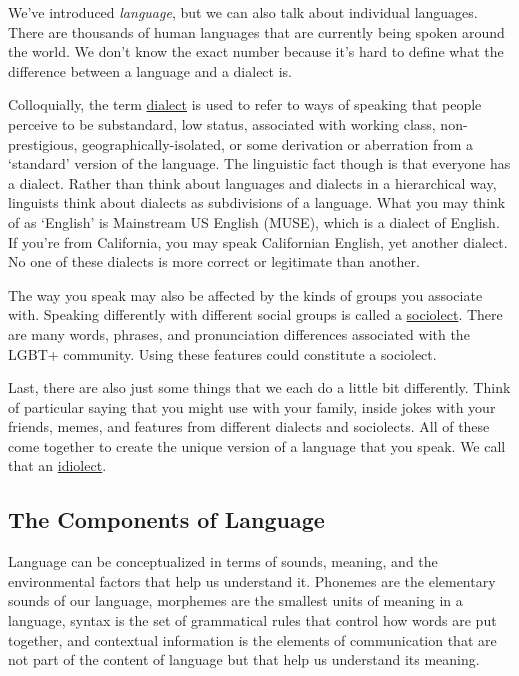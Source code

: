 \documentclass[
]{krantz}
\begin{document}
We've introduced \emph{language}, but we can also talk about individual languages. There are thousands of human languages that are currently being spoken around the world. We don't know the exact number because it's hard to define what the difference between a language and a dialect is.

Colloquially, the term \protect\hyperlink{dialect}{dialect} is used to refer to ways of speaking that people perceive to be substandard, low status, associated with working class, non-prestigious, geographically-isolated, or some derivation or aberration from a `standard' version of the language. The linguistic fact though is that everyone has a dialect. Rather than think about languages and dialects in a hierarchical way, linguists think about dialects as subdivisions of a language. What you may think of as `English' is Mainstream US English (MUSE), which is a dialect of English. If you're from California, you may speak Californian English, yet another dialect. No one of these dialects is more correct or legitimate than another.

The way you speak may also be affected by the kinds of groups you associate with. Speaking differently with different social groups is called a \protect\hyperlink{sociolect}{sociolect}. There are many words, phrases, and pronunciation differences associated with the LGBT+ community. Using these features could constitute a sociolect.

Last, there are also just some things that we each do a little bit differently. Think of particular saying that you might use with your family, inside jokes with your friends, memes, and features from different dialects and sociolects. All of these come together to create the unique version of a language that you speak. We call that an \protect\hyperlink{idiolect}{idiolect}.

\hypertarget{the-components-of-language}{%
\subsection*{The Components of Language}\label{the-components-of-language}}


Language can be conceptualized in terms of sounds, meaning, and the environmental factors that help us understand it. Phonemes are the elementary sounds of our language, morphemes are the smallest units of meaning in a language, syntax is the set of grammatical rules that control how words are put together, and contextual information is the elements of communication that are not part of the content of language but that help us understand its meaning.
\end{document}
